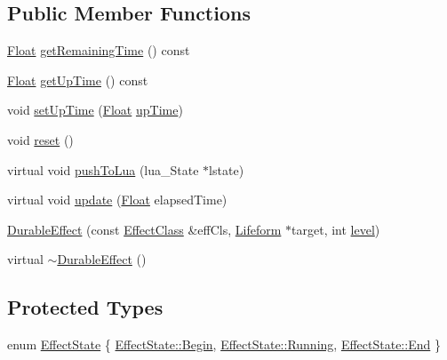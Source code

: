 \subsection*{Public Member Functions}
\begin{DoxyCompactItemize}
\item 
\hyperlink{namespaceZeta_a1e0a1265f9b3bd3075fb0fabd39088ba}{Float} \hyperlink{classZeta_1_1DurableEffect_a7c79f9b9ccbff3e835205a9bc64396ab}{get\+Remaining\+Time} () const 
\item 
\hyperlink{namespaceZeta_a1e0a1265f9b3bd3075fb0fabd39088ba}{Float} \hyperlink{classZeta_1_1DurableEffect_ae8b0278a05521d23487df0344a4150b3}{get\+Up\+Time} () const 
\item 
void \hyperlink{classZeta_1_1DurableEffect_aca458dc1f813daa173b2ee947a2ea5dd}{set\+Up\+Time} (\hyperlink{namespaceZeta_a1e0a1265f9b3bd3075fb0fabd39088ba}{Float} \hyperlink{classZeta_1_1DurableEffect_ab8ee9c3e4b0a65c2c150b3baadd2ca5c}{up\+Time})
\item 
void \hyperlink{classZeta_1_1DurableEffect_af248002385f1ae31a3f053bd74748a23}{reset} ()
\item 
virtual void \hyperlink{classZeta_1_1DurableEffect_a307aa900d5ab1f188cd4bc0c706bd910}{push\+To\+Lua} (lua\+\_\+\+State $\ast$lstate)
\item 
virtual void \hyperlink{classZeta_1_1DurableEffect_aa9ebe74ba0c6c7b724473f3ab81b08f0}{update} (\hyperlink{namespaceZeta_a1e0a1265f9b3bd3075fb0fabd39088ba}{Float} elapsed\+Time)
\item 
\hyperlink{classZeta_1_1DurableEffect_ab3fa069cf8c745ad238cedb5c89b7720}{Durable\+Effect} (const \hyperlink{classZeta_1_1EffectClass}{Effect\+Class} \&eff\+Cls, \hyperlink{classZeta_1_1Lifeform}{Lifeform} $\ast$target, int \hyperlink{classZeta_1_1Effect_aec101c1a7eda022328a0b0ebb1b10c77}{level})
\item 
virtual \hyperlink{classZeta_1_1DurableEffect_af38f16c0189ad5dae484b4e722250468}{$\sim$\+Durable\+Effect} ()
\end{DoxyCompactItemize}
\subsection*{Protected Types}
\begin{DoxyCompactItemize}
\item 
enum \hyperlink{classZeta_1_1DurableEffect_abcf4ec499ab94dbad5b1e6aeb45d6ba4}{Effect\+State} \{ \hyperlink{classZeta_1_1DurableEffect_abcf4ec499ab94dbad5b1e6aeb45d6ba4a1a06729125544cab7cee73195fc044f0}{Effect\+State\+::\+Begin}, 
\hyperlink{classZeta_1_1DurableEffect_abcf4ec499ab94dbad5b1e6aeb45d6ba4a5bda814c4aedb126839228f1a3d92f09}{Effect\+State\+::\+Running}, 
\hyperlink{classZeta_1_1DurableEffect_abcf4ec499ab94dbad5b1e6aeb45d6ba4a87557f11575c0ad78e4e28abedc13b6e}{Effect\+State\+::\+End}
 \}
\end{DoxyCompactItemize}
